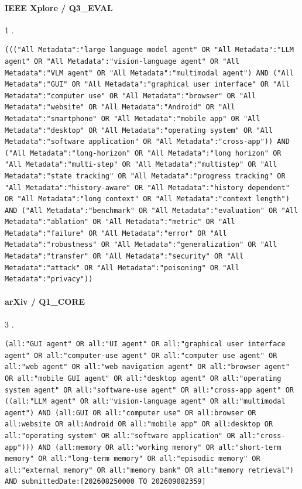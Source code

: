 \noindent\begin{minipage}{\linewidth}
\paragraph{IEEE Xplore / Q3\_EVAL}
1 .
\begin{lstlisting}
((("All Metadata":"large language model agent" OR "All Metadata":"LLM agent" OR "All Metadata":"vision-language agent" OR "All Metadata":"VLM agent" OR "All Metadata":"multimodal agent") AND ("All Metadata":"GUI" OR "All Metadata":"graphical user interface" OR "All Metadata":"computer use" OR "All Metadata":"browser" OR "All Metadata":"website" OR "All Metadata":"Android" OR "All Metadata":"smartphone" OR "All Metadata":"mobile app" OR "All Metadata":"desktop" OR "All Metadata":"operating system" OR "All Metadata":"software application" OR "All Metadata":"cross-app")) AND ("All Metadata":"long-horizon" OR "All Metadata":"long horizon" OR "All Metadata":"multi-step" OR "All Metadata":"multistep" OR "All Metadata":"state tracking" OR "All Metadata":"progress tracking" OR "All Metadata":"history-aware" OR "All Metadata":"history dependent" OR "All Metadata":"long context" OR "All Metadata":"context length") AND ("All Metadata":"benchmark" OR "All Metadata":"evaluation" OR "All Metadata":"ablation" OR "All Metadata":"metric" OR "All Metadata":"failure" OR "All Metadata":"error" OR "All Metadata":"robustness" OR "All Metadata":"generalization" OR "All Metadata":"transfer" OR "All Metadata":"security" OR "All Metadata":"attack" OR "All Metadata":"poisoning" OR "All Metadata":"privacy"))
\end{lstlisting}
\end{minipage}\par\medskip
\noindent\begin{minipage}{\linewidth}
\paragraph{arXiv / Q1\_CORE}
3 .
\begin{lstlisting}
(all:"GUI agent" OR all:"UI agent" OR all:"graphical user interface agent" OR all:"computer-use agent" OR all:"computer use agent" OR all:"web agent" OR all:"web navigation agent" OR all:"browser agent" OR all:"mobile GUI agent" OR all:"desktop agent" OR all:"operating system agent" OR all:"software-use agent" OR all:"cross-app agent" OR ((all:"LLM agent" OR all:"vision-language agent" OR all:"multimodal agent") AND (all:GUI OR all:"computer use" OR all:browser OR all:website OR all:Android OR all:"mobile app" OR all:desktop OR all:"operating system" OR all:"software application" OR all:"cross-app"))) AND (all:memory OR all:"working memory" OR all:"short-term memory" OR all:"long-term memory" OR all:"episodic memory" OR all:"external memory" OR all:"memory bank" OR all:"memory retrieval") AND submittedDate:[202608250000 TO 202609082359]
\end{lstlisting}
\end{minipage}\par\medskip
